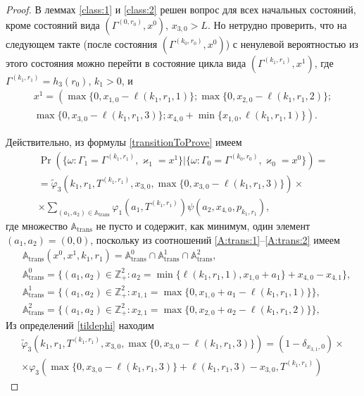 \documentclass{report}
\begin{document}
\begin{proof}
В леммах \eqref{class:1} и \eqref{class:2} решен вопрос для всех начальных состояний, кроме состояний вида $(\Gamma^{(0,r_0)},x^0)$, $x_{3,0}>L$. Но нетрудно проверить, что на следующем такте (после состояния $(\Gamma^{(k_0,r_0)},x^0)$) с ненулевой вероятностью из этого состояния можно перейти в состояние цикла вида $(\Gamma^{(k_1,r_1)},x^1)$, где $\Gamma^{(k_1,r_1)} = h_3(r_0)$, $k_1>0$, и 
\begin{multline*}
x^{1}=\left(\max{\{0,x_{1,0} - \ell(k_1,r_1,1)\}};
\max{\{0,x_{2,0} - \ell(k_1,r_1,2)\}};\right.\\
\left.
\max{\{0,x_{3,0} - \ell(k_1,r_1,3)\}};
x_{4,0} + \min{\{x_{1,0}, \ell(k_1,r_1,1)\}}\right).
\end{multline*}


Действительно, из формулы \eqref{transitionToProve} имеем
\begin{multline*}
\Pr (\{\omega\colon \Gamma_{1}=\Gamma^{(k_1,r_1)},\varkappa_{1}=x^1 \}| \{\omega\colon \Gamma_{0}=\Gamma^{(k_0,r_0)},\varkappa_0=x^0\})=\\
=\widetilde{\varphi}_3(k_1,r_1,T^{(k_1,r_1)},x_{3,0},\max{\{0,x_{3,0} - \ell(k_1,r_1,3)\}})\times \\
\times
\sum_{(a_1,a_2)\in {\mathbb A}_{\mathrm{trans}}}\varphi_1(a_1,T^{(k_1,r_1)})  \psi(a_2,x_{4,0}, p_{k_1,r_1}),
\end{multline*}
где множество ${\mathbb A}_{\mathrm{trans}}$ не пусто и содержит, как минимум, один элемент $(a_1,a_2)=(0,0)$, поскольку из соотношений \eqref{A:trans:1}--\eqref{A:trans:2} имеем
\begin{align*}
&{\mathbb A}_{\mathrm{trans}}(x^0,x^1,k_1,r_1) = {\mathbb A}_{\mathrm{trans}}^0 \cap {\mathbb A}_{\mathrm{trans}}^1\cap {\mathbb A}_{\mathrm{trans}}^2,\\
&{\mathbb A}_{\mathrm{trans}}^0 = \{(a_1,a_2) \in \mathbb{Z}_+^2 \colon a_2 = \min{\{\ell(k_1,r_1,1), x_{1,0}+a_1}\} +x_{4,0}- x_{4,1}\},\\
&{\mathbb A}_{\mathrm{trans}}^1 = \{(a_1,a_2) \in \mathbb{Z}_+^2 \colon x_{1,1}=\max{\{0,x_{1,0}+a_1-\ell(k_1,r_1,1)\}}\},\\
& {\mathbb A}_{\mathrm{trans}}^2 = \{(a_1,a_2) \in \mathbb{Z}_+^2 \colon  x_{2,1} =\max{\{0,x_{2,0}+a_2-\ell(k_1,r_1,2)\}}\},
\end{align*}
Из определений \eqref{tildephi} находим
\begin{multline*}
\widetilde{\varphi}_3(k_1,r_1,T^{(k_1,r_1)},x_{3,0},\max{\{0,x_{3,0} - \ell(k_1,r_1,3)\}}) = (1-\delta_{x_{3,1},0}) \times \\\times\varphi_3(\max{\{0,x_{3,0} - \ell(k_1,r_1,3)\}} + \ell (k_1,r_1,3) - x_{3,0},T^{(k_1,r_1)} ) 

\end{multline*}
\end{proof}
\end{document}
